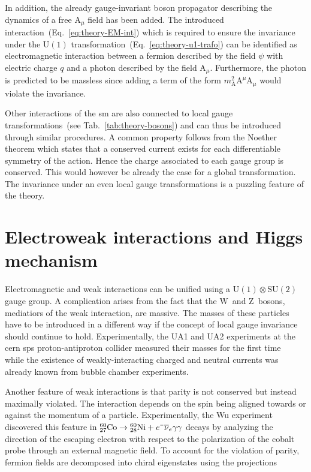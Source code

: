 In addition, the already gauge-invariant boson propagator describing the dynamics of a free $\mathrm{A}_\mu$ field has been added. The introduced interaction~(Eq.~\ref{eq:theory-EM-int}) which is required to ensure the invariance under the $\mathrm{U(1)}$ transformation~(Eq.~\ref{eq:theory-u1-trafo}) can be identified as electromagnetic interaction between a fermion described by the field $\psi$ with electric charge $q$ and a photon described by the field $\mathrm{A}_\mu$. Furthermore, the photon is predicted to be massless since adding a term of the form $m^{2}_\mathrm{A}\mathrm{A}^\mu \mathrm{A}_\mu$ would violate the invariance.

Other interactions of the \gls{sm} are also connected to local gauge transformations~(see Tab.~\ref{tab:theory-bosons}) and can thus be introduced through similar procedures. A common property follows from the Noether theorem which states that a conserved current exists for each differentiable symmetry of the action. Hence the charge associated to each gauge group is conserved. This would however be already the case for a global transformation. The invariance under an even local gauge transformations is a puzzling feature of the theory.



\section{Electroweak interactions and Higgs mechanism}
\label{sec:theory-ewk}

Electromagnetic and weak interactions can be unified using a $\mathrm{U(1)}\otimes \mathrm{SU(2)}$ gauge group. A complication arises from the fact that the $\mathrm{W}$~and $\mathrm{Z}$~bosons, mediatiors of the weak interaction, are massive. The masses of these particles have to be introduced in a different way if the concept of local gauge invariance should continue to hold. Experimentally, the UA1 and UA2 experiments at the \gls{cern} \gls{sps} proton-antiproton collider measured their masses for the first time~\cite{Arnison:1983rp,Banner:1983jy,Arnison:1983mk,Bagnaia:1983zx} while the existence of weakly-interacting charged and neutral currents was already known from bubble chamber experiments. 

Another feature of weak interactions is that parity is not conserved but instead maximally violated. The interaction depends on the spin being aligned towards or against the momentum of a particle. Experimentally, the Wu experiment~\cite{PhysRev.105.1413} discovered this feature in ${}_{27}^{60}\mathrm{Co}\to{}_{28}^{60}\mathrm{Ni}+e^{\rmminus}\bar{\nu}_{e}\gamma\gamma$ decays by analyzing the direction of the escaping electron with respect to the polarization of the cobalt probe through an external magnetic field. To account for the violation of parity, fermion fields are decomposed into chiral eigenstates using the projections


